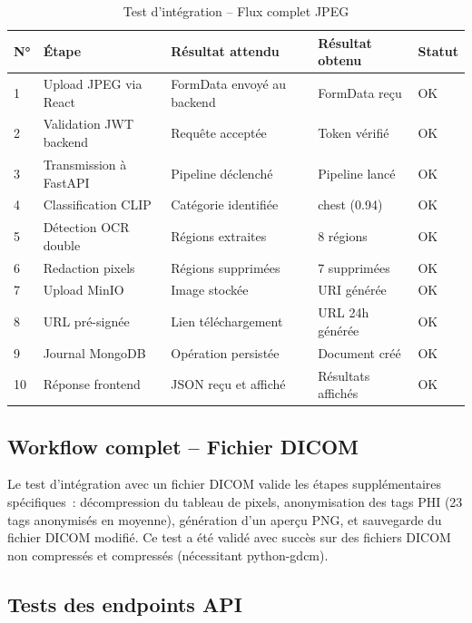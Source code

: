\begin{table}[H]
\centering
\caption{Test d'intégration -- Flux complet JPEG}
\label{tab:integ_jpeg}
\begin{tabularx}{\textwidth}{p{0.5cm} X p{3.5cm} p{1.5cm} p{1.2cm}}
\toprule
\textbf{N°} & \textbf{Étape} & \textbf{Résultat attendu} & \textbf{Résultat obtenu} & \textbf{Statut} \\
\midrule
1 & Upload JPEG via React & FormData envoyé au backend & FormData reçu & \textcolor{green!60!black}{OK} \\
2 & Validation JWT backend & Requête acceptée & Token vérifié & \textcolor{green!60!black}{OK} \\
3 & Transmission à FastAPI & Pipeline déclenché & Pipeline lancé & \textcolor{green!60!black}{OK} \\
4 & Classification CLIP & Catégorie identifiée & chest (0.94) & \textcolor{green!60!black}{OK} \\
5 & Détection OCR double & Régions extraites & 8 régions & \textcolor{green!60!black}{OK} \\
6 & Redaction pixels & Régions supprimées & 7 supprimées & \textcolor{green!60!black}{OK} \\
7 & Upload MinIO & Image stockée & URI générée & \textcolor{green!60!black}{OK} \\
8 & URL pré-signée & Lien téléchargement & URL 24h générée & \textcolor{green!60!black}{OK} \\
9 & Journal MongoDB & Opération persistée & Document créé & \textcolor{green!60!black}{OK} \\
10 & Réponse frontend & JSON reçu et affiché & Résultats affichés & \textcolor{green!60!black}{OK} \\
\bottomrule
\end{tabularx}
\end{table}

\subsection{Workflow complet -- Fichier DICOM}

Le test d'intégration avec un fichier DICOM valide les étapes supplémentaires spécifiques~: décompression du tableau de pixels, anonymisation des tags PHI (23 tags anonymisés en moyenne), génération d'un aperçu PNG, et sauvegarde du fichier DICOM modifié. Ce test a été validé avec succès sur des fichiers DICOM non compressés et compressés (nécessitant python-gdcm).

\subsection{Tests des endpoints API}


